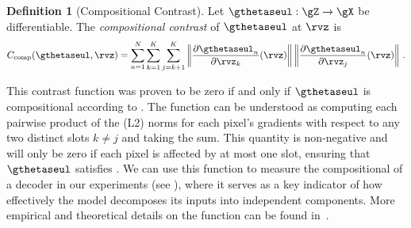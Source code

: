 \documentclass{article} %
\theoremstyle{plain}
\theoremstyle{definition}
\newtheorem{definition}[theorem]{Definition}
\theoremstyle{remark}
\numberwithin{equation}{section}
\begin{document}
\begin{definition}[Compositional Contrast] \label{def:compositional_contrast}
    Let $\gthetaseul: \gZ\to\gX$ be differentiable. The \emph{compositional contrast} of $\gthetaseul$ at $\rvz$ is
    \begin{equation} \label{eq:compositional_contrast}
        {C_{\mathrm{comp}}}(\gthetaseul, \rvz) = \sum\limits_{n=1}^{N} 
        \sum\limits_{\substack{k=1}}^{K}
        \sum\limits_{j=k+1}^{K}
        \left\|\frac{\partial \gthetaseul_{n}}{\partial \rvz_{k}}(\rvz)\right\|
        \left\|\frac{\partial \gthetaseul_{n}}{\partial \rvz_{j}}(\rvz)\right\|
        \,.
    \end{equation}
\end{definition}
This contrast function was proven to be zero if and only if $\gthetaseul$ is compositional according to . The function can be understood as computing each pairwise product of the (L2) norms for each pixel's gradients with respect to any two distinct slots $k \neq j$ and taking the sum. This quantity is non-negative and will only be zero if each pixel is affected by at most one slot, ensuring that $\gthetaseul$ satisfies .  We can use this function to measure the compositional of a decoder in our experiments (see ), where it serves as a key indicator of how effectively the model decomposes its inputs into independent components. More empirical and theoretical details on the function can be found in~\citet{brady2023provably}.


\end{document}
